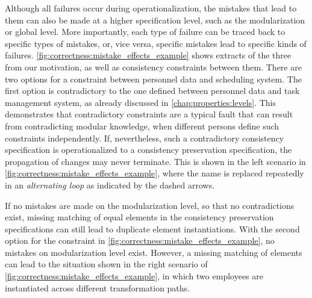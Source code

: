 Although all failures occur during operationalization, the mistakes that lead to them can also be made at a higher specification level, such as the modularization or global level.
More importantly, each type of failure can be traced back to specific types of mistakes, or, vice versa, specific mistakes lead to specific kinds of failures.
\autoref{fig:correctness:mistake_effects_example} shows extracts of the three \metamodels from our motivation, as well as consistency constraints between them.
There are two options for a constraint between personnel data and scheduling system.
The first option is contradictory to the one defined between personnel data and task management system, as already discussed in \autoref{chap:properties:levels}.
This demonstrates that contradictory constraints are a typical fault that can result from contradicting modular knowledge, when different persons define such constraints independently.
If, nevertheless, such a contradictory consistency specification is operationalized to a consistency preservation specification, the propagation of changes may never terminate.
This is shown in the left scenario in \autoref{fig:correctness:mistake_effects_example}, where
the name is replaced repeatedly in an \emph{alternating loop} as indicated by the dashed arrows.

If no mistakes are made on the modularization level, so that no contradictions exist, %
missing matching of equal elements in the consistency preservation specifications can still lead to duplicate element instantiations.
With the second option for the constraint in \autoref{fig:correctness:mistake_effects_example}, %
no mistakes on modularization level exist.
However, a missing matching of elements %
can lead to the situation shown in the right scenario of \autoref{fig:correctness:mistake_effects_example}, in which two employees are instantiated across different transformation paths.

